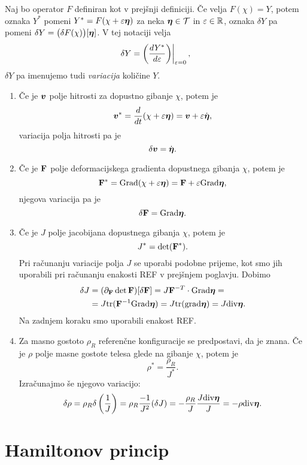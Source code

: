 \begin{notacija}
	Naj bo operator $F$ definiran kot v prejšnji definiciji. Če velja $F(\chi)=Y$,
	potem oznaka $Y^*$ pomeni $Y^*=F(\chi+\varepsilon\boldsymbol \eta)$ za neka $\boldsymbol \eta\in\mathcal{T}$ in $\varepsilon\in\mathbb R$,
	oznaka $\delta Y$ pa pomeni $\delta Y=\big(\delta F(\chi)\big)[\boldsymbol \eta]$. V tej notaciji velja
	\[ \delta Y = \at{\left(\frac{dY^*}{d\varepsilon}\right)}{\varepsilon=0}, \]
	$\delta Y$ pa imenujemo tudi \emph{variacija} količine $Y$.
\end{notacija}

\begin{primeri}
	\begin{enumerate}
		\item
			Če je $\boldsymbol v$ polje hitrosti za dopustno gibanje $\chi$, potem je
			\[ \boldsymbol v^*=\frac{d}{dt}(\chi+\varepsilon\boldsymbol \eta)=\boldsymbol v+\varepsilon\dot{\boldsymbol \eta}, \]
			variacija polja hitrosti pa je
			\[ \delta\boldsymbol v=\dot{\boldsymbol \eta}. \]
		\item
			Če je $\mathbf F$ polje deformacijskega gradienta dopustnega gibanja $\chi$, potem je
			\[ \mathbf F^*=\mathrm{Grad}(\chi+\varepsilon\boldsymbol \eta)=\mathbf F+\varepsilon\mathrm{Grad}\boldsymbol \eta, \]
			njegova variacija pa je
			\[ \delta\mathbf F=\mathrm{Grad}\boldsymbol \eta. \]
		\item
			Če je $J$ polje jacobijana dopustnega gibanja $\chi$, potem je
			\[ J^*=\det(\mathbf F^*). \]
			Pri računanju variacije polja $J$ se uporabi podobne prijeme,
			kot smo jih uporabili pri računanju enakosti REF v prejšnjem poglavju. Dobimo
			\begin{align*}
				\delta J&=(\partial_{\mathbf F}\det\mathbf F)[\delta\mathbf F]=J\mathbf F^{-T}\cdot\mathrm{Grad}\boldsymbol \eta=\\
				&=J\mathrm{tr}(\mathbf F^{-1}\mathrm{Grad}\boldsymbol \eta)=J\mathrm{tr}(\mathrm{grad}\boldsymbol \eta)=J\mathrm{div}\boldsymbol \eta.
			\end{align*}
			Na zadnjem koraku smo uporabili enakost REF.
		\item
			Za masno gostoto $\rho_R$ referenčne konfiguracije se predpostavi, da je znana. Če je
			$\rho$ polje masne gostote telesa glede na gibanje $\chi$, potem je
			\[ \rho^*=\frac{\rho_R}{J^*}. \]
			Izračunajmo še njegovo variacijo:
			\[
				\delta\rho=\rho_R\delta\left(\frac{1}{J}\right)=
				\rho_R\frac{-1}{J^2}(\delta J)=-\frac{\rho_R}{J}\frac{J\mathrm{div}\boldsymbol \eta}{J}=-\rho\mathrm{div}\boldsymbol \eta.
			\]
	\end{enumerate}
\end{primeri}


\section{Hamiltonov princip}


